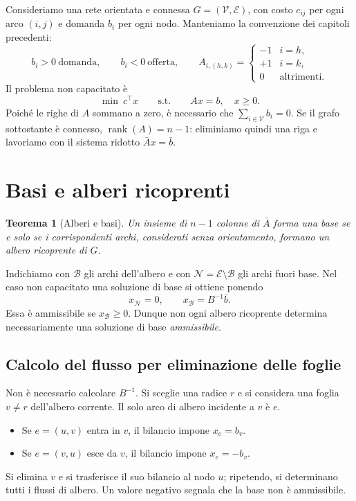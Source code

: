 \documentclass[11pt,a4paper]{article}
\newtheorem{theorem}[definition]{Teorema}
\newcommand{\V}{\mathcal{V}}
\newcommand{\E}{\mathcal{E}}
\newcommand{\Bset}{\mathcal{B}}
\newcommand{\Nset}{\mathcal{N}}
\begin{document}
Consideriamo una rete orientata e connessa $G=(\V,\E)$, con costo $c_{ij}$ per ogni arco $(i,j)$ e domanda $b_i$ per ogni nodo. Manteniamo la convenzione dei capitoli precedenti:
\[
b_i>0\ \text{domanda},\qquad b_i<0\ \text{offerta},\qquad
A_{i,(h,k)}=\begin{cases}-1&i=h,\\+1&i=k,\\0&\text{altrimenti.}\end{cases}
\]
Il problema non capacitato è
\begin{equation}\label{eq:mcf}
\min\ c^\top x\qquad \text{s.t.}\qquad Ax=b,\quad x\geq0.
\end{equation}
Poiché le righe di $A$ sommano a zero, è necessario che $\sum_{i\in\V}b_i=0$. Se il grafo sottostante è connesso, $\operatorname{rank}(A)=n-1$: eliminiamo quindi una riga e lavoriamo con il sistema ridotto $\bar A x=\bar b$.

\section{Basi e alberi ricoprenti}

\begin{theorem}[Alberi e basi]
Un insieme di $n-1$ colonne di $\bar A$ forma una base se e solo se i corrispondenti archi, considerati senza orientamento, formano un albero ricoprente di $G$.
\end{theorem}

Indichiamo con $\Bset$ gli archi dell'albero e con $\Nset=\E\setminus\Bset$ gli archi fuori base. Nel caso non capacitato una soluzione di base si ottiene ponendo
\[
x_{\Nset}=0,\qquad x_{\Bset}=B^{-1}\bar b.
\]
Essa è ammissibile se $x_{\Bset}\geq0$. Dunque non ogni albero ricoprente determina necessariamente una soluzione di base \emph{ammissibile}.

\subsection{Calcolo del flusso per eliminazione delle foglie}

Non è necessario calcolare $B^{-1}$. Si sceglie una radice $r$ e si considera una foglia $v\neq r$ dell'albero corrente. Il solo arco di albero incidente a $v$ è $e$.
\begin{itemize}
\item Se $e=(u,v)$ entra in $v$, il bilancio impone $x_e=b_v$.
\item Se $e=(v,u)$ esce da $v$, il bilancio impone $x_e=-b_v$.
\end{itemize}
Si elimina $v$ e si trasferisce il suo bilancio al nodo $u$; ripetendo, si determinano tutti i flussi di albero. Un valore negativo segnala che la base non è ammissibile.
\end{document}
